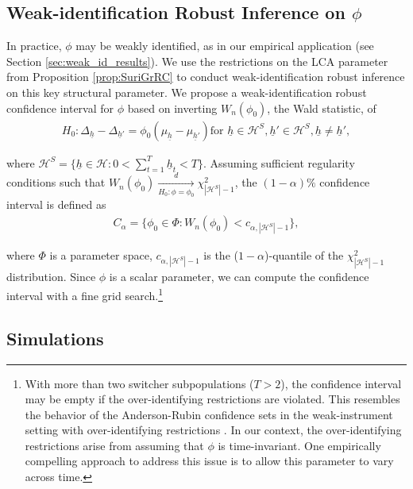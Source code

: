 \documentclass[12pt]{article}
\theoremstyle{plain}
\theoremstyle{definition}
\begin{document}
\subsection{Weak-identification Robust Inference on \texorpdfstring{$\phi$}{phi}}
In practice, $\phi$ may be weakly identified, as in our empirical application (see Section \ref{sec:weak_id_results}). 
We use the restrictions on the LCA parameter from Proposition \ref{prop:SuriGrRC} to conduct weak-identification robust inference on this key structural parameter.
We propose a weak-identification robust confidence interval for $\phi$ based on inverting ${W}_n(\phi_0)$, the Wald statistic, of
\begin{align}H_0: \Delta_{\underline{h}}-\Delta_{\underline{h}'}=\phi_0\left(\mu_{\underline{h}}-\mu_{\underline{h}'}\right) \text{for $\underline{h}\in\mathcal{H}^S, \underline{h}'\in\mathcal{H}^S, \underline{h}\neq \underline{h}'$},\end{align}

\noindent where $\mathcal{H}^S=\{\underline{h}\in\mathcal{H}: 0<\sum_{t=1}^T\underline{h}_t<T\}$. Assuming sufficient regularity conditions such that $W_n(\phi_0)\underset{H_0:\phi=\phi_0}{\overset{d}{\longrightarrow}}\chi^2_{|\mathcal{H}^S|-1}$, the $(1-\alpha)\%$ confidence interval is defined as
\begin{align}C_{\alpha}=\{\phi_0\in\Phi:W_n(\phi_0)<c_{\alpha,|\mathcal{H}^S|-1}\},\end{align}

\noindent where $\Phi$ is a parameter space, $c_{\alpha,|\mathcal{H}^{S}|-1}$ is the ($1-\alpha$)-quantile of the $\chi^2_{|\mathcal{H}^{S}|-1}$ distribution. Since $\phi$ is a scalar parameter, we can compute the confidence interval with a fine grid search.\footnote{With more than two switcher subpopulations ($T>2$), the confidence interval may be empty if the over-identifying restrictions are violated. This resembles the behavior of the Anderson-Rubin confidence sets in the weak-instrument setting with over-identifying restrictions \citep{ASS2019}. In our context, the over-identifying restrictions arise from assuming that $\phi$ is time-invariant. One empirically compelling approach to address this issue is to allow this parameter to vary across time.}


\subsection{Simulations}\label{sec:simulations}
\end{document}

